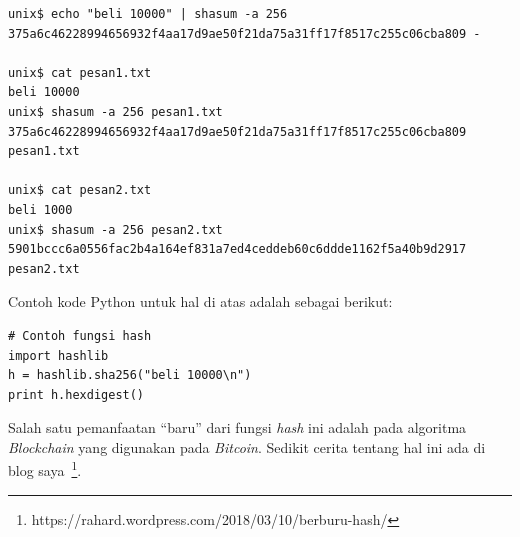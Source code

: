 \begin{verbatim}
unix$ echo "beli 10000" | shasum -a 256
375a6c46228994656932f4aa17d9ae50f21da75a31ff17f8517c255c06cba809 -

unix$ cat pesan1.txt
beli 10000
unix$ shasum -a 256 pesan1.txt
375a6c46228994656932f4aa17d9ae50f21da75a31ff17f8517c255c06cba809 pesan1.txt

unix$ cat pesan2.txt
beli 1000
unix$ shasum -a 256 pesan2.txt
5901bccc6a0556fac2b4a164ef831a7ed4ceddeb60c6ddde1162f5a40b9d2917 pesan2.txt
\end{verbatim}

Contoh kode Python untuk hal di atas adalah sebagai berikut:

\begin{verbatim}
# Contoh fungsi hash
import hashlib
h = hashlib.sha256("beli 10000\n")
print h.hexdigest()
\end{verbatim}


Salah satu pemanfaatan ``baru'' dari fungsi {\em hash} ini adalah pada
algoritma {\em Blockchain} yang digunakan pada {\em Bitcoin}. Sedikit
cerita tentang hal ini ada di blog
saya~\footnote{https://rahard.wordpress.com/2018/03/10/berburu-hash/}.
